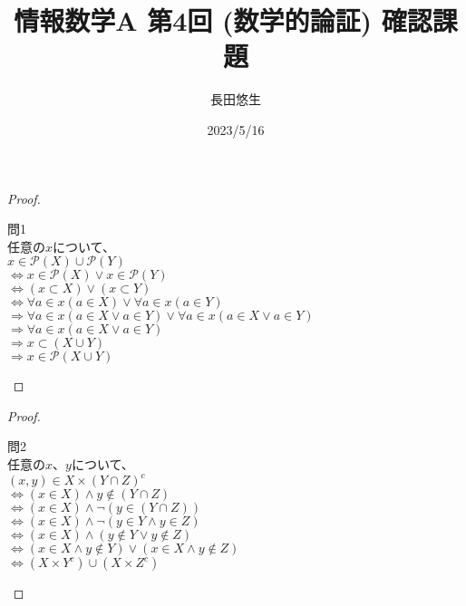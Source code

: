 \documentclass[dvipdfmx,uplatex]{jsarticle}
\title{情報数学A 第4回 (数学的論証) 確認課題}
\author{長田悠生}
\date{2023/5/16}
\begin{document}
  \begin{titlepage}
    \maketitle
    \begin{center}
      \textmc{\HUGE \LaTeX}
    \end{center}
    \thispagestyle{empty}
  \end{titlepage}
  \begin{center}
  \end{center}
  \begin{proof}
    \begin{flushleft}
      問1 \\
      任意の$x$について、 \\
      $x \in \mathscr{P}(X) \cup \mathscr{P}(Y)$ \\
      $\Leftrightarrow x \in \mathscr{P}(X) \lor x \in \mathscr{P}(Y)$ \\
      $\Leftrightarrow (x \subset X) \lor (x \subset Y)$ \\
      $\Leftrightarrow \forall a \in x (a \in X) \lor \forall a \in x (a \in Y)$ \\
      $\Rightarrow \forall a \in x (a \in X \lor a \in Y) \lor \forall a \in x (a \in X \lor a \in Y)$ \\
      $\Rightarrow \forall a \in x (a \in X \lor a \in Y)$ \\
      $\Rightarrow x \subset (X \cup Y)$ \\
      $\Rightarrow x \in \mathscr{P}(X \cup Y)$
    \end{flushleft}
  \end{proof}

  \begin{center}
  \end{center}
  \begin{proof}
    \begin{flushleft}
      問2 \\
      任意の$x$、$y$について、 \\
      $(x, y) \in X \times (Y \cap Z)^c$ \\
      $\Leftrightarrow (x \in X) \land y \notin (Y \cap Z)$ \\
      $\Leftrightarrow (x \in X) \land \neg (y \in (Y \cap Z))$ \\
      $\Leftrightarrow (x \in X) \land \neg (y \in Y \land y \in Z)$ \\
      $\Leftrightarrow (x \in X) \land (y \notin Y \lor y \notin Z)$ \\
      $\Leftrightarrow (x \in X \land y \notin Y) \lor (x \in X \land y \notin Z)$ \\
      $\Leftrightarrow (X \times Y^c) \cup (X \times Z^c)$
    \end{flushleft}
  \end{proof}
\end{document}
